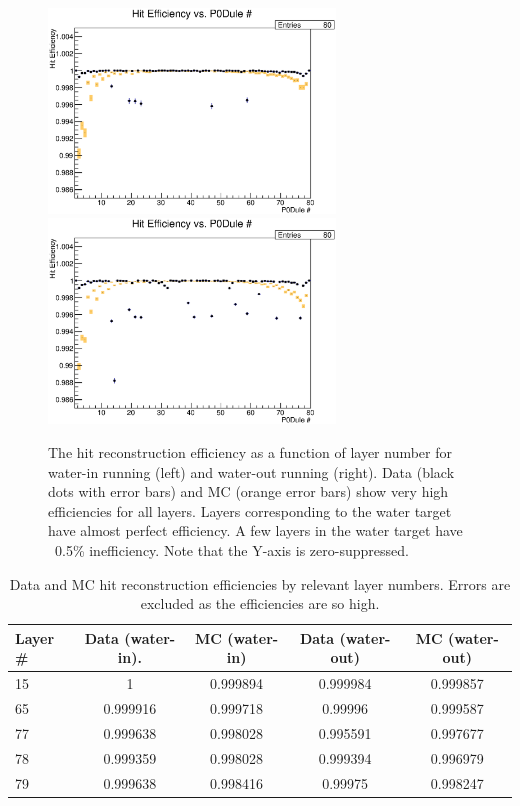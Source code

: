 \begin{figure}
\centering
\includegraphics[width=3in]{Figures/Systematics/HitEfficiency/Hiteffsandw.eps}
\includegraphics[width=3in]{Figures/Systematics/HitEfficiency/Hiteffsanda.eps}
\caption{The hit reconstruction efficiency as a function of layer number for water-in running (left) and water-out running (right). Data (black dots with error bars) and MC (orange error bars) show very high efficiencies for all layers. Layers corresponding to the water target have almost perfect efficiency. A few layers in the water target have ~0.5\% inefficiency. Note that the Y-axis is zero-suppressed.}
\label{fig:hiteffsand}
\end{figure}

\begin{table}
\caption{Data and MC hit reconstruction efficiencies by relevant layer numbers. Errors are excluded as the efficiencies are so high. }
\centering
\begin{tabular}{lcccc}\toprule\midrule
Layer \# &  Data (water-in). & MC (water-in) & Data (water-out) & MC (water-out)  \\ \midrule
15 & 1 & 0.999894 & 0.999984 & 0.999857 \\ \midrule
65 & 0.999916 & 0.999718 & 0.99996 & 0.999587 \\ \midrule
77 & 0.999638 & 0.998028 & 0.995591 & 0.997677 \\ \midrule
78 & 0.999359 & 0.998028 & 0.999394 & 0.996979 \\ \midrule
79 & 0.999638 & 0.998416 & 0.99975 & 0.998247 \\ \midrule
\bottomrule
\end{tabular}
\label{tab:hiteff}
\end{table}


